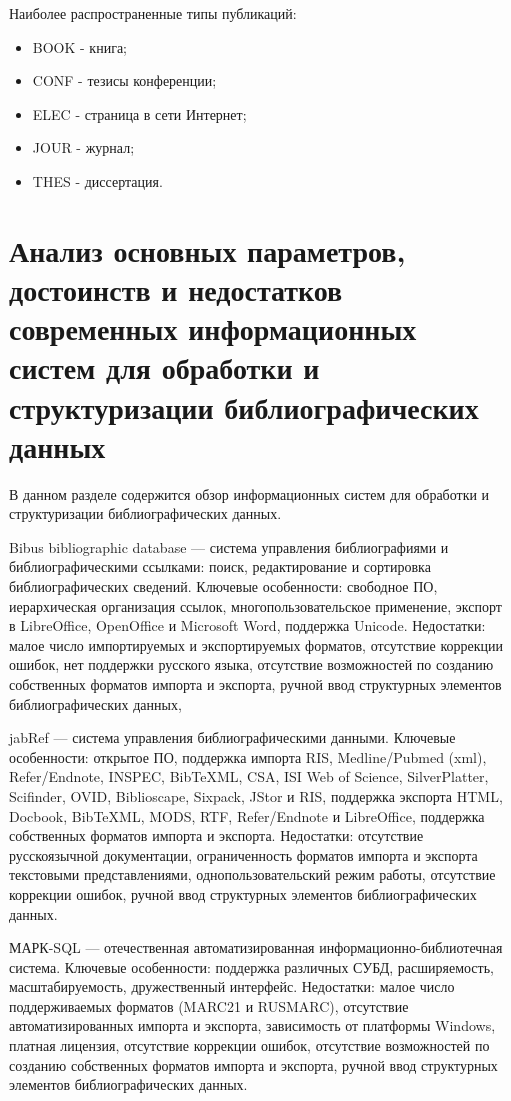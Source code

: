Наиболее распространенные типы публикаций:

\begin{itemize}
	\item BOOK - книга;
	\item CONF - тезисы конференции;
	\item ELEC - страница в сети Интернет;
	\item JOUR - журнал;
	\item THES - диссертация.
\end{itemize}

\section{Анализ основных параметров, достоинств и недостатков современных информационных систем для обработки и структуризации библиографических данных}

В данном разделе содержится обзор информационных систем для обработки и структуризации библиографических данных.

Bibus bibliographic database — система управления библиографиями и библиографическими ссылками: поиск, редактирование и сортировка библиографических сведений.
Ключевые особенности: свободное ПО, иерархическая организация ссылок, многопользовательское применение, экспорт в LibreOffice, OpenOffice и Microsoft Word, поддержка Unicode.
Недостатки: малое число импортируемых и экспортируемых форматов, отсутствие коррекции ошибок, нет поддержки русского языка, отсутствие возможностей по созданию собственных форматов импорта и экспорта, ручной ввод структурных элементов библиографических данных, 

jabRef — система управления библиографическими данными.
Ключевые особенности: открытое ПО, поддержка импорта RIS, Medline/Pubmed (xml), Refer/Endnote, INSPEC, BibTeXML, CSA, ISI Web of Science, SilverPlatter, Scifinder, OVID, Biblioscape, Sixpack, JStor и RIS, поддержка экспорта HTML, Docbook, BibTeXML, MODS, RTF, Refer/Endnote и LibreOffice, поддержка собственных форматов импорта и экспорта.
Недостатки: отсутствие русскоязычной документации, ограниченность форматов импорта и экспорта текстовыми представлениями, однопользовательский режим работы, отсутствие коррекции ошибок, ручной ввод структурных элементов библиографических данных.

МАРК-SQL — отечественная автоматизированная информационно-библиотечная система.
Ключевые особенности: поддержка различных СУБД, расширяемость, масштабируемость, дружественный интерфейс.
Недостатки: малое число поддерживаемых форматов (MARC21 и RUSMARC), отсутствие автоматизированных импорта и экспорта, зависимость от платформы Windows, платная лицензия, отсутствие коррекции ошибок, отсутствие возможностей по созданию собственных форматов импорта и экспорта, ручной ввод структурных элементов библиографических данных.

